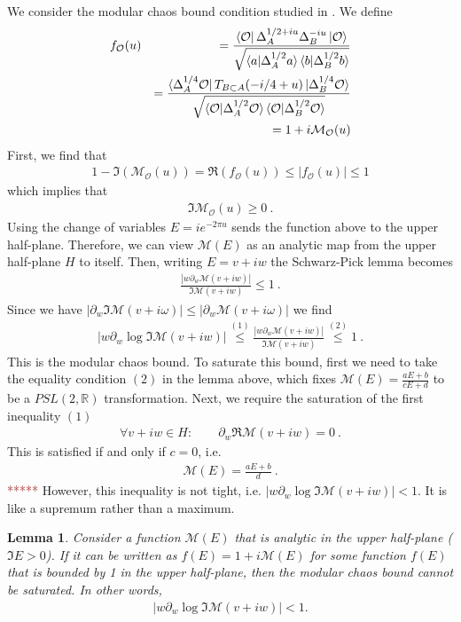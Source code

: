 \documentclass[a4paper,11pt]{article}
\newtheorem{lemma}[theorem]{Lemma}
\theoremstyle{definition}
\newcommand{\nn}{\nonumber}
\newcommand{\mO}{\mathcal{O}}
\newcommand{\mM}{\mathcal{M}}
\newcommand{\p}{\partial}
\newcommand{\KL}[1]{\textcolor{brown}{#1}}
\begin{document}
We consider the modular chaos bound condition studied in \cite{}. We define
\begin{eqnarray}
    f_\mO(u)&&=\frac{\bra{\mO}\Delta_A^{1/2+iu}\Delta_B^{-iu}\ket{\mO}}{\sqrt{\braket{a|\Delta_A^{1/2}a}\braket{b|\Delta_B^{1/2}b}}}\\
    &&=\frac{\bra{\Delta_A^{1/4}\mO} T_{B\subset A}(-i/4+u)\ket{\Delta_B^{1/4} \mO}}{\sqrt{\braket{\mO|\Delta_A^{1/2}\mO}\braket{\mO|\Delta_B^{1/2}\mO}}}\nn\\
    &&=1+i \mathcal{M}_{\mO}(u)
\end{eqnarray}
First, we find that 
\begin{eqnarray}
    1-\Im(\mathcal{M}_\mO(u))=\Re(f_\mO(u))\leq |f_\mO(u)|\leq 1
\end{eqnarray}
which implies that 
\begin{eqnarray}
    \Im\mathcal{M}_\mO(u)\geq 0\ .
\end{eqnarray}
Using the change of variables $E=ie^{-2\pi u}$ sends the function above to the upper half-plane. Therefore, we can view $\mM(E)$ as an analytic map from the upper half-plane $H$ to itself. Then, writing $E=v+iw$ the Schwarz-Pick lemma becomes
\begin{eqnarray}
    \frac{|w \p_w \mM(v+iw)|}{\Im \mM(v+iw)}\leq 1\ . 
\end{eqnarray}
Since we have $|\p_w \Im\mM(v+i\omega)|\leq |\p_w \mM(v+i\omega)|$ we find
\begin{eqnarray}
    |w\p_w \log \Im \mM(v+iw)| \stackrel{(1)}{\leq} \frac{|w \p_w \mM(v+iw)|}{\Im \mM(v+iw)} \stackrel{(2)}{\leq} 1\ .
\end{eqnarray}
This is the modular chaos bound. To saturate this bound, first we need to take the equality condition $(2)$ in the lemma above, which fixes $\mM(E)=\frac{a E+b}{c E+d}$ to be a $PSL(2,\mathbb{R})$ transformation. Next, we require the saturation of the first inequality $(1)$
\begin{eqnarray}
    \forall v+iw\in H:\qquad \p_w \Re \mM(v+iw)=0\ .
\end{eqnarray}
This is satisfied if and only if $c=0$, i.e.
\begin{eqnarray}
    \mM(E)=\frac{a E+b}{d}\ .
\end{eqnarray}
\KL{*****} However, this inequality is not tight, i.e. $|w\p_w \log \Im \mM(v+iw)| < 1$. It is like a supremum rather than a maximum.
\begin{lemma}
    Consider a function $\mM(E)$ that is analytic in the upper half-plane ($\Im E > 0$). If it can be written as $f(E) = 1+i\mM(E)$ for some function $f(E)$ that is bounded by 1 in the upper half-plane, then the modular chaos bound cannot be saturated. In other words,
    \begin{align}
        |w\p_w \log \Im \mM(v+iw)| < 1.
    \end{align}
\end{lemma}
\end{document}
